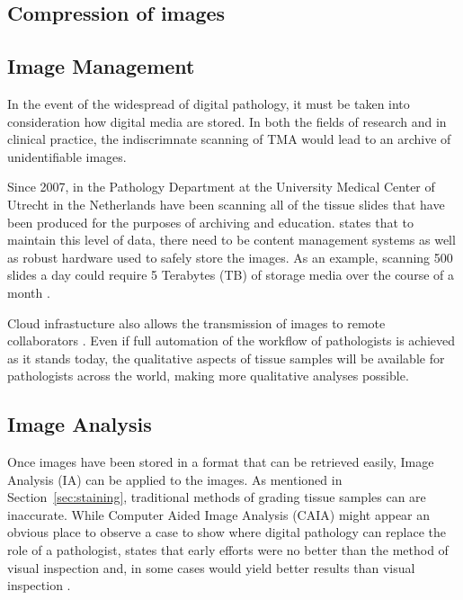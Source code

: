 \documentclass[12pt]{article}
\begin{document}
\subsection{Compression of images}


\subsection{Image Management}
In the event of the widespread of digital pathology, it must be taken into consideration how digital media are stored. 
In both the fields of research and in clinical practice, the indiscrimnate scanning of TMA would lead to an archive 
of unidentifiable images.

Since 2007, \parencite{stathonikos2013going} in the Pathology Department at the University Medical Center of Utrecht 
in the Netherlands have been scanning all of the tissue slides that have been produced for the purposes of archiving 
and education. \parencite{hamilton2014digital} states that to maintain this level of data, there need to be content 
management systems as well as robust hardware used to safely store the images. As an example, scanning 500 slides 
a day could require 5 Terabytes (TB) of storage media over the course of a month \parencite{hamilton2014digital}.

Cloud infrastucture also allows the transmission of images to remote collaborators \parencite{webster2014whole}. Even 
if full automation of the workflow of pathologists is achieved as it stands today, the qualitative aspects of tissue 
samples will be available for pathologists across the world, making more qualitative analyses possible.

\subsection{Image Analysis}
Once images have been stored in a format that can be retrieved easily, Image Analysis (IA) can be applied to the 
images. As mentioned in Section~\ref{sec:staining}, traditional methods of grading tissue samples can are inaccurate. 
While Computer Aided Image Analysis (CAIA) might appear an obvious place to observe a case to show where digital 
pathology can replace the role of a pathologist, \citeauthor{dabbs2013diagnostic} states that early efforts were no 
better than the method of visual inspection and, in some cases would yield better results than visual inspection 
\parencite{dabbs2013diagnostic}.
\end{document}
